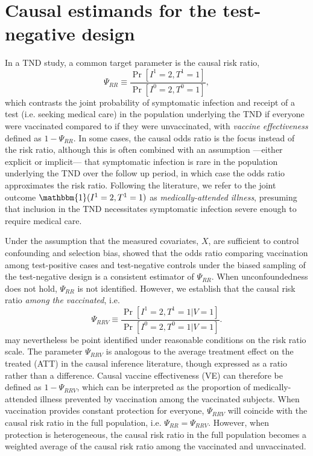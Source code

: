 \documentclass[11pt]{article}
\begin{document}
\section{Causal estimands for the test-negative design} \label{sec:estimands}
In a TND study, a common target parameter is the causal risk ratio,
\begin{equation*}
    \Psi_{RR} \equiv \dfrac{\Pr[I^1 = 2, T^1 = 1]}{\Pr[I^0 = 2, T^0 = 1]},
\end{equation*}
which contrasts the joint probability of symptomatic infection and receipt of a test (i.e. seeking medical care) in the population underlying the TND if everyone were vaccinated compared to if they were unvaccinated, with \textit{vaccine effectiveness} defined as $1 - \Psi_{RR}$. In some cases, the causal odds ratio is the focus instead of the risk ratio, although this is often combined with an assumption ---either explicit or implicit--- that symptomatic infection is rare in the population underlying the TND over the follow up period, in which case the odds ratio approximates the risk ratio. Following the literature, we refer to the joint outcome $\mathbbm{1}(I^1 = 2, T^1 = 1)$ as \textit{medically-attended illness}, presuming that inclusion in the TND necessitates symptomatic infection severe enough to require medical care. 

Under the assumption that the measured covariates, $X$, are sufficient to control confounding and selection bias,  \cite{schnitzer_estimands_2022} showed that the odds ratio comparing vaccination among test-positive cases and test-negative controls under the biased sampling of the test-negative design is a consistent estimator of $\Psi_{RR}$. When unconfoundedness does not hold, $\Psi_{RR}$ is not identified. However, we establish that the causal risk ratio \textit{among the vaccinated}, i.e.
\begin{equation*}
    \Psi_{RRV} \equiv \dfrac{\Pr[I^1 = 2, T^1 =1 | V = 1]}{\Pr[I^0 = 2, T^0 =1 | V = 1]} .
\end{equation*}
may nevertheless be point identified under reasonable conditions on the risk ratio scale. The parameter $\Psi_{RRV}$ is analogous to the average treatment effect on the treated (ATT) in the causal inference literature, though expressed as a ratio rather than a difference. Causal vaccine effectiveness (VE) can therefore be defined as $1-\Psi_{RRV}$, which can be interpreted as the proportion of medically-attended illness prevented by vaccination among the vaccinated subjects. When vaccination provides constant protection for everyone, $\Psi_{RRV}$ will coincide with the causal risk ratio in the full population, i.e. $\Psi_{RR} = \Psi_{RRV}$. However, when protection is heterogeneous, the causal risk ratio in the full population becomes a weighted average of the causal risk ratio among the vaccinated and unvaccinated.
\end{document}
